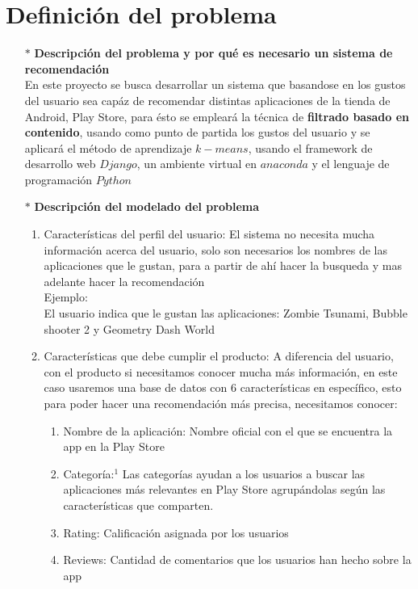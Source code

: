 \documentclass[10pt, a4paper]{article}
\begin{document}
\section{Definici\'on del problema}
\begin{enumerate}
\item[$\ast$]\textbf{Descripción del problema y por qué es necesario un sistema de recomendaci\'on} \\
En este proyecto se busca desarrollar un sistema que basandose en los gustos del usuario sea cap\'az de recomendar distintas aplicaciones de la tienda de Android, Play Store, para \'esto se emplear\'a la t\'ecnica de \textbf{filtrado basado en contenido}, usando como punto de partida los gustos del usuario y se aplicar\'a el m\'etodo de aprendizaje $k-means$, usando el framework de desarrollo web $Django$, un ambiente virtual en $anaconda$ y el lenguaje de programaci\'on $Python$
\item[$\ast$]\textbf{Descripción del modelado del problema } \\
\begin{enumerate}
\item Características del perfil del usuario: El sistema no necesita mucha informaci\'on acerca del usuario, solo son necesarios los nombres de las aplicaciones que le gustan, para a partir de ah\'i hacer la busqueda y mas adelante hacer la recomendaci\'on\\
Ejemplo:\\
El usuario indica que le gustan las aplicaciones: Zombie Tsunami, Bubble shooter 2 y Geometry Dash World
\item Características que debe cumplir el producto: A diferencia del usuario, con el producto si necesitamos conocer mucha m\'as informaci\'on, en este caso usaremos una base de datos con 6 caracter\'isticas en espec\'ifico, esto para poder hacer una recomendaci\'on m\'as precisa, necesitamos conocer: \\
\begin{enumerate}
\item Nombre de la aplicaci\'on: Nombre oficial con el que se encuentra la app en la Play Store
\item Categor\'ia:$^{1}$ Las categorías ayudan a los usuarios a buscar las aplicaciones más relevantes en Play Store agrup\'andolas seg\'un las caracter\'isticas que comparten.
\item Rating: Calificaci\'on asignada por los usuarios 
\item Reviews: Cantidad de comentarios que los usuarios han hecho sobre la app

\end{enumerate}
\end{enumerate}
\end{enumerate}
\end{document}
